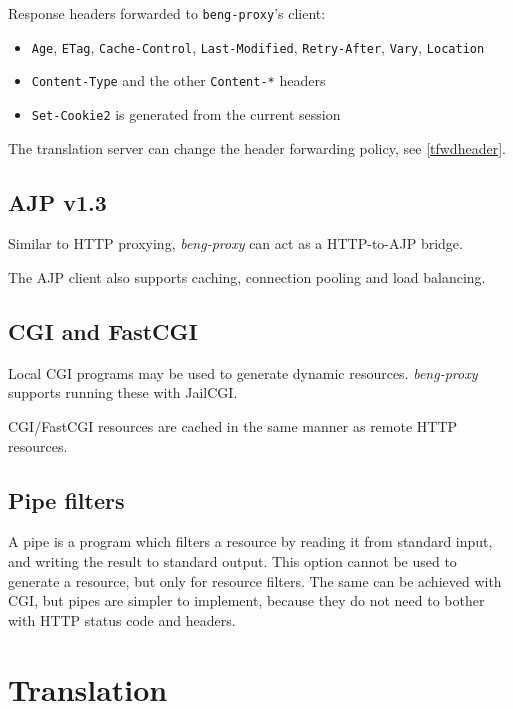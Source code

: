 \documentclass[a4paper,12pt]{article}
\begin{document}
Response headers forwarded to \texttt{beng-proxy}'s client:

\begin{itemize}
\item \texttt{Age}, \texttt{ETag}, \texttt{Cache-Control},
  \texttt{Last-Modified}, \texttt{Retry-After}, \texttt{Vary},
  \texttt{Location}
\item \texttt{Content-Type} and the other \texttt{Content-*} headers
\item \texttt{Set-Cookie2} is generated from the current session
\end{itemize}

The translation server can change the header forwarding policy, see
\ref{tfwdheader}.

\subsection{AJP v1.3}
\label{ajp}

Similar to HTTP proxying, \emph{beng-proxy} can act as a HTTP-to-AJP
bridge.

The AJP client also supports caching, connection pooling and load
balancing.

\subsection{CGI and FastCGI}
\label{cgi}

Local CGI programs may be used to generate dynamic resources.
\emph{beng-proxy} supports running these with JailCGI.

CGI/FastCGI resources are cached in the same manner as remote HTTP
resources.

\subsection{Pipe filters}
\label{pipe}

A pipe is a program which filters a resource by reading it from
standard input, and writing the result to standard output.  This
option cannot be used to generate a resource, but only for resource
filters.  The same can be achieved with CGI, but pipes are simpler to
implement, because they do not need to bother with HTTP status code
and headers.


\section{Translation}
\end{document}
